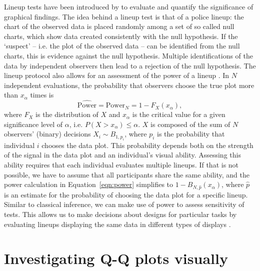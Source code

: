 \documentclass{article}\usepackage[]{graphicx}\usepackage[]{color}
\begin{document}
Lineup tests have been introduced by \citet{buja:2009hp} to evaluate and quantify the significance of graphical findings. The idea behind a lineup test is that of a police lineup: the chart of the observed data is placed randomly among a set of so called null charts, which show data created consistently with the null hypothesis. 
If the `suspect' -- i.e. the plot of the observed data -- can be identified from the null charts, this is evidence against the null hypothesis. Multiple identifications of the data by independent observers then lead to a rejection of the null hypothesis.
The lineup protocol also allows for an assessment of the power of a lineup \citep{mahbub:2013}. 
In $N$ independent evaluations, the probability that observers
choose the true plot more than $x_\alpha$ times is
\begin{equation}\label{eqn:power}
\widehat{\text{Power}} = \text{Power}_{N} = 1 - F_{X} (x_{\alpha}),
\end{equation}
where $F_X$ is the distribution of $X$ and $x_\alpha$ is the critical value for a given significance level of $\alpha$, i.e. $P(X >  x_{\alpha}) \le \alpha$. $X$ is composed of the sum of $N$ observers' (binary) decisions $X_i \sim B_{1, p_i}$, where  $p_i$ is the probability that individual $i$ chooses the data plot. This probability  depends both on the strength of the signal in the data plot and an individual's visual ability.
Assessing this ability requires that each individual evaluates multiple lineups. 
If that is not possible, we have to assume that all participants share the same ability, and the power calculation in Equation~\ref{eqn:power} simplifies to $1 - B_{N, \hat{p}}(x_\alpha)$, where $\widehat{p}$ is an estimate for the probability of choosing the data plot for a specific lineup. Similar to classical inference, we can make use of power to assess sensitivity of tests. This allows us to make decisions about designs for particular tasks by evaluating lineups displaying  the same data in different types of displays \citep{Hofmann:2012ts}. 

\section{Investigating Q-Q plots visually}\label{sec:qqplot}
\end{document}
